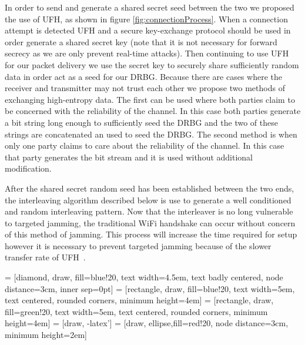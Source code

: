 \documentclass[sigconf]{acmart}
\begin{document}
In order to send and generate a shared secret seed between the two we proposed the use of UFH, as shown in figure \ref{fig:connectionProcess}. When a connection attempt is detected UFH and a secure key-exchange protocol should be used in order generate a shared secret key (note that it is not necessary for forward secrecy as we are only prevent real-time attacks). Then continuing to use UFH for our packet delivery we use the secret key to securely share sufficiently random data in order act as a seed for our DRBG. Because there are cases where the receiver and transmitter may not trust each other we propose two methods of exchanging high-entropy data. The first can be used where both parties claim to be concerned with the reliability of the channel. In this case both parties generate a bit string long enough to sufficiently seed the DRBG and the two of these strings are concatenated an used to seed the DRBG. The second method is when only one party claims to care about the reliability of the channel. In this case that party generates the bit stream and it is used without additional modification. 

After the shared secret random seed has been established between the two ends, the interleaving algorithm described below is use to generate a well conditioned and random interleaving pattern. Now that the interleaver is no long vulnerable to targeted jamming, the traditional WiFi handshake can occur without concern of this method of jamming. This process will increase the time required for setup however it is necessary to prevent targeted jamming because of the slower transfer rate of UFH~\cite{strasser2008jamming}.

 = [diamond, draw, fill=blue!20, 
    text width=4.5em, text badly centered, node distance=3cm, inner sep=0pt]
 = [rectangle, draw, fill=blue!20, 
    text width=5em, text centered, rounded corners, minimum height=4em]
 = [rectangle, draw, fill=green!20, 
    text width=5em, text centered, rounded corners, minimum height=4em]
 = [draw, -latex']
 = [draw, ellipse,fill=red!20, node distance=3cm,
    minimum height=2em]
\end{document}
